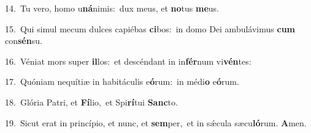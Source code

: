 {\numbfont\textcolor{\numbcolor}{14.}}~Tu vero, homo u\-\textbf{ná}\-nimis:~\star dux meus, et \textbf{no}\-tus \textbf{me}\-us.\par
{\numbfont\textcolor{\numbcolor}{15.}}~Qui simul mecum dulces capiébas \textbf{ci}\-bos:~\star in domo Dei ambulávimus \textbf{cum} con\-\textbf{sén}\-su.\par
{\numbfont\textcolor{\numbcolor}{16.}}~Véniat mors super \textbf{il}\-los:~\star et descéndant in in\-\textbf{fér}\-num vi\-\textbf{vén}\-tes:\par
{\numbfont\textcolor{\numbcolor}{17.}}~Quóniam nequítiæ in habitáculis e\-\textbf{ó}\-rum:~\star in médi\textbf{o} e\-\textbf{ó}\-rum.\par
{\numbfont\textcolor{\numbcolor}{18.}}~Glória Patri, et \textbf{Fí}\-lio,~\star et Spi\-\textbf{rí}\-tui \textbf{Sanc}\-to.\par
{\numbfont\textcolor{\numbcolor}{19.}}~Sicut erat in princípio, et nunc, et \textbf{sem}\-per,~\star et in sǽcula sæcu\-\textbf{ló}\-rum. \textbf{A}\-men.\par
